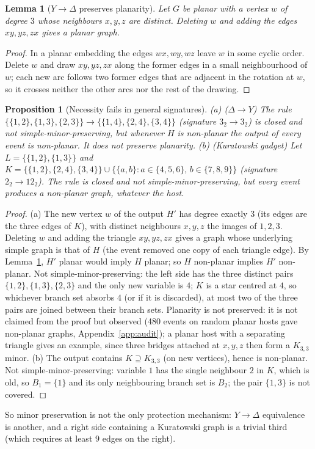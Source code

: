 \documentclass[10pt]{article}
\theoremstyle{definition}
\theoremstyle{plain}
\newtheorem{proposition}[theorem]{Proposition}
\newtheorem{lemma}[theorem]{Lemma}
\theoremstyle{remark}
\begin{document}
\begin{lemma}[$Y\to\Delta$ preserves planarity]\label{lem:YDelta}
Let $G$ be planar with a vertex $w$ of degree $3$ whose neighbours $x,y,z$ are distinct. Deleting $w$ and adding the edges $xy,yz,zx$ gives a planar graph.
\end{lemma}
\begin{proof}
In a planar embedding the edges $wx,wy,wz$ leave $w$ in some cyclic order. Delete $w$ and draw $xy,yz,zx$ along the former edges in a small neighbourhood of $w$; each new arc follows two former edges that are adjacent in the rotation at $w$, so it crosses neither the other arcs nor the rest of the drawing.
\end{proof}

\begin{proposition}[Necessity fails in general signatures]\label{prop:necfail}
(a) ($\Delta\to Y$) The rule $\{\{1,2\},\{1,3\},\{2,3\}\}\to\{\{1,4\},\{2,4\},\{3,4\}\}$ (signature $3_2\to3_2$) is closed and not simple-minor-preserving, but whenever $H$ is non-planar the output of every event is non-planar. It does not preserve planarity.
(b) (Kuratowski gadget) Let $L=\{\{1,2\},\{1,3\}\}$ and $K=\{\{1,2\},\{2,4\},\{3,4\}\}\cup\{\{a,b\}:a\in\{4,5,6\},\,b\in\{7,8,9\}\}$ (signature $2_2\to12_2$). The rule is closed and not simple-minor-preserving, but every event produces a non-planar graph, whatever the host.
\end{proposition}
\begin{proof}
(a) The new vertex $w$ of the output $H'$ has degree exactly $3$ (its edges are the three edges of $K$), with distinct neighbours $x,y,z$ the images of $1,2,3$. Deleting $w$ and adding the triangle $xy,yz,zx$ gives a graph whose underlying simple graph is that of $H$ (the event removed one copy of each triangle edge). By Lemma~\ref{lem:YDelta}, $H'$ planar would imply $H$ planar; so $H$ non-planar implies $H'$ non-planar. Not simple-minor-preserving: the left side has the three distinct pairs $\{1,2\},\{1,3\},\{2,3\}$ and the only new variable is $4$; $K$ is a star centred at $4$, so whichever branch set absorbs $4$ (or if it is discarded), at most two of the three pairs are joined between their branch sets. Planarity is not preserved: it is not claimed from the proof but observed (480 events on random planar hosts gave non-planar graphs, Appendix~\ref{app:audit}); a planar host with a separating triangle gives an example, since three bridges attached at $x,y,z$ then form a $K_{3,3}$ minor.
(b) The output contains $K\supseteq K_{3,3}$ (on new vertices), hence is non-planar. Not simple-minor-preserving: variable $1$ has the single neighbour $2$ in $K$, which is old, so $B_1=\{1\}$ and its only neighbouring branch set is $B_2$; the pair $\{1,3\}$ is not covered.
\end{proof}
\noindent So minor preservation is not the only protection mechanism: $Y\!\to\!\Delta$ equivalence is another, and a right side containing a Kuratowski graph is a trivial third (which requires at least $9$ edges on the right).
\end{document}
